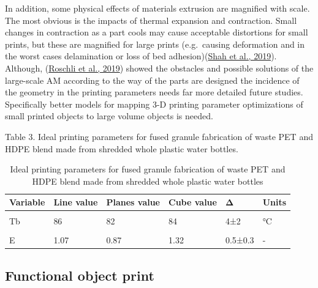 \documentclass[
  12pt,
  number,
  review]{elsarticle}
\begin{document}
In addition, some physical effects of materials extrusion are magnified
with scale. The most obvious is the impacts of thermal expansion and
contraction. Small changes in contraction as a part cools may cause
acceptable distortions for small prints, but these are magnified for
large prints (e.g.~causing deformation and in the worst cases
delamination or loss of bed
adhesion)(\protect\hyperlink{ref-shah2019}{Shah et al., 2019}).
Although, (\protect\hyperlink{ref-roschli2019}{Roschli et al., 2019})
showed the obstacles and possible solutions of the large-scale AM
according to the way of the parts are designed the incidence of the
geometry in the printing parameters needs far more detailed future
studies. Specifically better models for mapping 3-D printing parameter
optimizations of small printed objects to large volume objects is
needed.

Table 3. Ideal printing parameters for fused granule fabrication of
waste PET and HDPE blend made from shredded whole plastic water bottles.

\begin{table}
\caption{Ideal printing parameters for fused granule fabrication of waste PET and
HDPE blend made from shredded whole plastic water bottles}\tabularnewline

\centering\begingroup\fontsize{7}{9}\selectfont

\begin{tabular}[t]{llllll}
\toprule
Variable & Line value & Planes value & Cube value & Δ & Units\\
\midrule
\cellcolor{gray!6}{T1} & \cellcolor{gray!6}{258} & \cellcolor{gray!6}{263} & \cellcolor{gray!6}{264} & \cellcolor{gray!6}{6 ±3.2} & \cellcolor{gray!6}{°C}\\
Tb & 86 & 82 & 84 & 4±2 & °C\\
\cellcolor{gray!6}{Ps} & \cellcolor{gray!6}{21} & \cellcolor{gray!6}{14} & \cellcolor{gray!6}{10} & \cellcolor{gray!6}{11±5.6} & \cellcolor{gray!6}{mm/s}\\
E & 1.07 & 0.87 & 1.32 & 0.5±0.3 & -\\
\bottomrule
\end{tabular}
\endgroup{}
\end{table}

\hypertarget{functional-object-print}{%
\subsection{Functional object print}\label{functional-object-print}}
\end{document}
